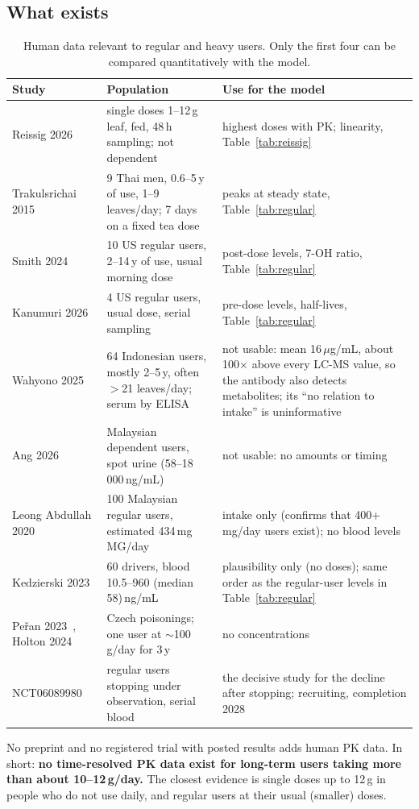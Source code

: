 \documentclass[10pt,a4paper]{article}
\begin{document}
\subsection{What exists}
\begin{table}[H]\centering\small
\caption{Human data relevant to regular and heavy users. Only the first four can be compared quantitatively with the model.}
\label{tab:heavylit}
\begin{tabular}{@{}p{3.0cm}p{5.6cm}p{6.8cm}@{}}
\toprule
Study & Population & Use for the model \\
\midrule
Reissig 2026~\cite{reissig2026} & single doses 1--12\,g leaf, fed, 48\,h sampling; not dependent & highest doses with PK; linearity, Table~\ref{tab:reissig} \\
Trakulsrichai 2015~\cite{trak2015} & 9 Thai men, 0.6--5\,y of use, 1--9 leaves/day; 7 days on a fixed tea dose & peaks at steady state, Table~\ref{tab:regular} \\
Smith 2024~\cite{smith2024} & 10 US regular users, 2--14\,y of use, usual morning dose & post-dose levels, 7-OH ratio, Table~\ref{tab:regular} \\
Kanumuri 2026~\cite{kanumuri2026} & 4 US regular users, usual dose, serial sampling & pre-dose levels, half-lives, Table~\ref{tab:regular} \\
\midrule
Wahyono 2025~\cite{wahyono2025} & 64 Indonesian users, mostly 2--5\,y, often $>$21 leaves/day; serum by ELISA & not usable: mean 16\,$\mu$g/mL, about 100$\times$ above every LC-MS value, so the antibody also detects metabolites; its ``no relation to intake'' is uninformative \\
Ang 2026~\cite{ang2026} & Malaysian dependent users, spot urine (58--18\,000\,ng/mL) & not usable: no amounts or timing \\
Leong Abdullah 2020~\cite{leong2020} & 100 Malaysian regular users, estimated 434\,mg MG/day & intake only (confirms that 400+\,mg/day users exist); no blood levels \\
Kedzierski 2023~\cite{kedzierski2023} & 60 drivers, blood 10.5--960 (median 58)\,ng/mL & plausibility only (no doses); same order as the regular-user levels in Table~\ref{tab:regular} \\
Peřan 2023~\cite{peran2023}, Holton 2024~\cite{holton2024} & Czech poisonings; one user at $\sim$100\,g/day for 3\,y & no concentrations \\
NCT06089980~\cite{nct06089980} & regular users stopping under observation, serial blood & the decisive study for the decline after stopping; recruiting, completion 2028 \\
\bottomrule
\end{tabular}
\end{table}
No preprint and no registered trial with posted results adds human PK data. In short: \textbf{no time-resolved PK data exist for
long-term users taking more than about 10--12\,g/day.} The closest evidence is single doses up to 12\,g in people who do not use
daily, and regular users at their usual (smaller) doses.
\end{document}
